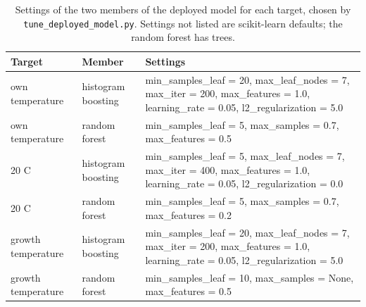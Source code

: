 \begin{table}[ht]\centering\small
\caption{Settings of the two members of the deployed model for each target, chosen by \texttt{tune\_deployed\_model.py}. Settings not listed are scikit-learn defaults; the random forest has \NForestTrees trees.}\label{tab:settings}
\begin{tabular}{llp{9.5cm}}
\toprule
Target & Member & Settings \\
\midrule
own temperature & histogram boosting & min\_samples\_leaf = 20, max\_leaf\_nodes = 7, max\_iter = 200, max\_features = 1.0, learning\_rate = 0.05, l2\_regularization = 5.0 \\
own temperature & random forest & min\_samples\_leaf = 5, max\_samples = 0.7, max\_features = 0.5 \\
20 C & histogram boosting & min\_samples\_leaf = 5, max\_leaf\_nodes = 7, max\_iter = 400, max\_features = 1.0, learning\_rate = 0.05, l2\_regularization = 0.0 \\
20 C & random forest & min\_samples\_leaf = 5, max\_samples = 0.7, max\_features = 0.2 \\
growth temperature & histogram boosting & min\_samples\_leaf = 20, max\_leaf\_nodes = 7, max\_iter = 200, max\_features = 1.0, learning\_rate = 0.05, l2\_regularization = 5.0 \\
growth temperature & random forest & min\_samples\_leaf = 10, max\_samples = None, max\_features = 0.5 \\
\bottomrule
\end{tabular}
\end{table}
